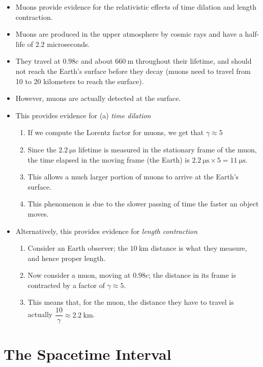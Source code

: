 \documentclass[a4paper,12pt]{article}
\let\oldsection\section
\renewcommand\section{\clearpage\oldsection}
\begin{document}
\begin{itemize}
  \item Muons provide evidence for the relativistic effects of time dilation and length contraction.
  \item Muons are produced in the upper atmosphere by cosmic rays and have a half-life of 2.2 microseconds.
  \item They travel at $0.98c$ and about $\SI{660}{\m}$ throughout their lifetime, and should not reach the Earth's surface before they decay (muons need to travel from 10 to 20 kilometers to reach the surface).
  \item However, muons are actually detected at the surface.
  \item This provides evidence for (a) \textit{time dilation}
        \begin{enumerate}
          \item If we compute the Lorentz factor for muons, we get that $\gamma \approx 5$
          \item Since the $\SI{2.2}{\micro\s}$ lifetime is measured in the stationary frame of the muon, the time elapsed in the moving frame (the Earth) is $\SI{2.2}{\micro\s} \times 5 = \SI{11}{\micro\s}$.
          \item This allows a much larger portion of muons to arrive at the Earth's surface.
          \item This phenomenon is due to the slower passing of time the faster an object moves.
        \end{enumerate}
  \item Alternatively, this provides evidence for \textit{length contraction}
        \begin{enumerate}
          \item Consider an Earth observer; the $\SI{10}{\kilo\m}$ distance is what they measure, and hence proper length.
          \item Now consider a muon, moving at $0.98c$; the distance in its frame is contracted by a factor of $\gamma \approx 5$.
          \item This means that, for the muon, the distance they have to travel is actually $\dfrac{10}{\gamma} \approx \SI{2.2}{\kilo\m}$.
        \end{enumerate}
\end{itemize}

\section{The Spacetime Interval}
\end{document}
